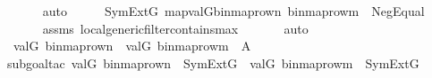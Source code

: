 \begin{isabellebody}
\ \ \ \ \isamarkupfalse%
\ auto\isanewline
\ \ \isamarkupfalse%
\ \isamarkupfalse%
\ {\isachardoublequoteopen}SymExt{\isacharparenleft}{\kern0pt}G{\isacharparenright}{\kern0pt}{\isacharcomma}{\kern0pt}\ map{\isacharparenleft}{\kern0pt}val{\isacharparenleft}{\kern0pt}G{\isacharparenright}{\kern0pt}{\isacharcomma}{\kern0pt}{\isacharbrackleft}{\kern0pt}binmap{\isacharunderscore}{\kern0pt}row{\isacharprime}{\kern0pt}{\isacharparenleft}{\kern0pt}n{\isacharparenright}{\kern0pt}{\isacharcomma}{\kern0pt}\ binmap{\isacharunderscore}{\kern0pt}row{\isacharprime}{\kern0pt}{\isacharparenleft}{\kern0pt}m{\isacharparenright}{\kern0pt}{\isacharbrackright}{\kern0pt}{\isacharparenright}{\kern0pt}\ {\isasymTurnstile}\ Neg{\isacharparenleft}{\kern0pt}Equal{\isacharparenleft}{\kern0pt}{}{\isacharcomma}{\kern0pt}\ {}{\isacharparenright}{\kern0pt}{\isacharparenright}{\kern0pt}{\isachardoublequoteclose}\isanewline
\ \ \ \ \isamarkupfalse%
\ assms\ local{\isachardot}{\kern0pt}generic{\isacharunderscore}{\kern0pt}filter{\isacharunderscore}{\kern0pt}contains{\isacharunderscore}{\kern0pt}max\ \isanewline
\ \ \ \ \isamarkupfalse%
\ auto\isanewline
\ \ \isamarkupfalse%
\ \isamarkupfalse%
\ {\isachardoublequoteopen}val{\isacharparenleft}{\kern0pt}G{\isacharcomma}{\kern0pt}\ binmap{\isacharunderscore}{\kern0pt}row{\isacharprime}{\kern0pt}{\isacharparenleft}{\kern0pt}n{\isacharparenright}{\kern0pt}{\isacharparenright}{\kern0pt}\ {\isasymnoteq}\ val{\isacharparenleft}{\kern0pt}G{\isacharcomma}{\kern0pt}\ binmap{\isacharunderscore}{\kern0pt}row{\isacharprime}{\kern0pt}{\isacharparenleft}{\kern0pt}m{\isacharparenright}{\kern0pt}{\isacharparenright}{\kern0pt}{\isachardoublequoteclose}\ {\isacharparenleft}{\kern0pt}\ {\isacharquery}{\kern0pt}A{\isacharparenright}{\kern0pt}\isanewline
\ \ \ \ \isamarkupfalse%
{\isacharparenleft}{\kern0pt}subgoal{\isacharunderscore}{\kern0pt}tac\ {\isachardoublequoteopen}val{\isacharparenleft}{\kern0pt}G{\isacharcomma}{\kern0pt}\ binmap{\isacharunderscore}{\kern0pt}row{\isacharprime}{\kern0pt}{\isacharparenleft}{\kern0pt}n{\isacharparenright}{\kern0pt}{\isacharparenright}{\kern0pt}\ {\isasymin}\ SymExt{\isacharparenleft}{\kern0pt}G{\isacharparenright}{\kern0pt}\ {\isasymand}\ val{\isacharparenleft}{\kern0pt}G{\isacharcomma}{\kern0pt}\ binmap{\isacharunderscore}{\kern0pt}row{\isacharprime}{\kern0pt}{\isacharparenleft}{\kern0pt}m{\isacharparenright}{\kern0pt}{\isacharparenright}{\kern0pt}\ {\isasymin}\ SymExt{\isacharparenleft}{\kern0pt}G{\isacharparenright}{\kern0pt}{\isachardoublequoteclose}{\isacharparenright}{\kern0pt}\isanewline

\end{isabellebody}
